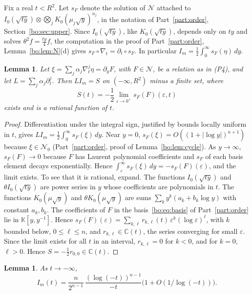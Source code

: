 \documentclass[11pt,a4paper]{article}
\newtheorem{lemma}[theorem]{Lemma}
\theoremstyle{definition}
\theoremstyle{remark}
\numberwithin{equation}{section}
\newcommand{\C}{\mathbb{C}}
\newcommand{\Kt}{\mathbb{K}}
\newcommand{\cN}{\mathcal{N}}
\begin{document}
Fix a real $t<R^2$. Let $s_F$ denote the solution of $\cN$ attached to $I_0(\sqrt{ty})\otimes\bigotimes_jK_0(\mu_j\sqrt y)^{n_j}$, in the notation of Part~\ref{part:order}, Section~\ref{bo:sec:upper}. Since $I_0(\sqrt{ty})$, like $K_0(\sqrt{ty})$, depends only on $ty$ and solves $\theta^2f=\frac{ty}4f$, the computation in the proof of Part~\ref{part:order}, Lemma~\ref{bo:lem:N}(d) gives $s_F\circ\nabla_t=\partial_t\circ s_F$. In particular $I_m=\frac12\int_0^\infty s_F(\eta)\,dy$.

\begin{lemma}\label{bs:lem:S}
Let $\xi=\sum_j\alpha_j\nabla_t^j\eta=\partial_yF$, with $F\in\cN$, be a relation as in (P4), and let $L=\sum_j\alpha_j\partial_t^j$. Then $LI_m=S$ on $(-\infty,R^2)$ minus a finite set, where
\[
S(t)=-\frac12\lim_{\varepsilon\to0^+}s_F(F)(\varepsilon,t)
\]
exists and is a rational function of $t$.
\end{lemma}

\begin{proof}
Differentiation under the integral sign, justified by bounds locally uniform in $t$, gives $LI_m=\frac12\int_0^\infty s_F(\xi)\,dy$. Near $y=0$, $s_F(\xi)=O((1+|\log y|)^{n+1})$ because $\xi\in\cN_0$ (Part~\ref{part:order}, proof of Lemma~\ref{bo:lem:cycle}). As $y\to\infty$, $s_F(F)\to0$ because $F$ has Laurent polynomial coefficients and $s_F$ of each basis element decays exponentially. Hence $\int_\varepsilon^\infty s_F(\xi)\,dy=-s_F(F)(\varepsilon)$, and the limit exists. To see that it is rational, expand. The functions $I_0(\sqrt{ty})$ and $\theta I_0(\sqrt{ty})$ are power series in $y$ whose coefficients are polynomials in $t$. The functions $K_0(\mu\sqrt y)$ and $\theta K_0(\mu\sqrt y)$ are sums $\sum_ky^k(a_k+b_k\log y)$ with constant $a_k,b_k$. The coefficients of $F$ in the basis~\eqref{bo:eq:basis} of Part~\ref{part:order} lie in $\Kt[y,y^{-1}]$. Hence $s_F(F)(\varepsilon)=\sum_{k,\ell}r_{k,\ell}(t)\,\varepsilon^k(\log\varepsilon)^\ell$, with $k$ bounded below, $0\le\ell\le n$, and $r_{k,\ell}\in\C(t)$, the series converging for small $\varepsilon$. Since the limit exists for all $t$ in an interval, $r_{k,\ell}=0$ for $k<0$, and for $k=0$, $\ell>0$. Hence $S=-\frac12r_{0,0}\in\C(t)$.
\end{proof}

\begin{lemma}\label{bs:lem:asym}
As $t\to-\infty$,
\[
I_m(t)=\frac{n}{2^{n-1}}\,\frac{(\log(-t))^{n-1}}{-t}\bigl(1+O(1/\log(-t))\bigr).
\]
\end{lemma}
\end{document}
